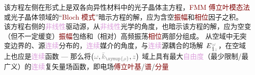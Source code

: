 {\one} 该方程左侧在形式上是\textcolor{PineGreen}{双各向异性}材料\cite{berryOpticalSingularitiesBianisotropic2005,changWavePropagationBianisotropic2014}中的光子晶体主方程\cite{sakodaOpticalPropertiesPhotonic2005,joannopoulosPhotonicCrystalsMolding2008}，\textcolor{Maroon}{FMM} \textcolor{Maroon}{傅立叶模态法}或光子晶体领域的“\textcolor{Maroon}{Bloch 模式}”暗示方程的解，应为含空\textcolor{Maroon}{振幅}和\textcolor{Maroon}{相位}因子之积。{\two} 该方程右侧的\textcolor{Plum}{非线性}\textcolor{NavyBlue}{驱动源}，从\textcolor{Plum}{非线性}光学的角度，也暗示该方程的解，应为空变（但不一定缓变）\textcolor{Maroon}{振幅}包络和（相对）高频振荡\textcolor{Maroon}{相位}两部分组成\cite{boydNonlinearOptics2019}。{\three} 从空域中无突变边界的、源\textcolor{Plum}{连续}分布的，\textcolor{Plum}{连续}媒介的角度，与\textcolor{Plum}{连续}源耦合的场解 $\Xint{\mathcolor{gray}{-}}{25}{E}^{\;\!\mathcolor{gray}{\omega}}_{\;\! \hat{1} \mathcolor{gray}{z}}$，在空域上也应是\textcolor{Plum}{连续}函数 --- 那么将$\left( \mathcolor{gray}{\omega}, \mathcolor{gray}{\bar{k}_{\symup{\rho}}}, \mathcolor{gray}{z} \right)$ 域上具有最大\textcolor{Plum}{自由度}（最少限制/最广义）的\textcolor{Plum}{连续}复矢量场函数，即电场\textcolor{Maroon}{傅立叶基}/\textcolor{Maroon}{谱}/\textcolor{Maroon}{分量}
